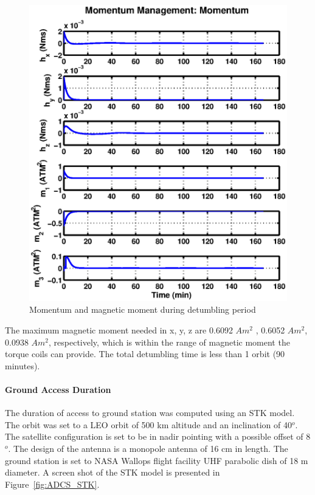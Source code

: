 \documentclass[12pt]{article}
\begin{document}
			\begin{figure}[!ht]
				\centering
				\includegraphics[scale=0.8]{images/ADCS_detumbling.eps}
				\caption{Momentum and magnetic moment during detumbling period}
				\label{fig:ADCS_detumbling}
			\end{figure}

			The maximum magnetic moment needed in x, y, z are 0.6092 $Am^2$ , 0.6052 $Am^2$, 0.0938 $Am^2$, respectively, which is within the range of magnetic moment the torque coils can provide. The total detumbling time is less than 1 orbit (90 minutes). 
			
			\paragraph{Ground Access Duration}
			The duration of access to ground station was computed using an STK model. The orbit was set to a LEO orbit of 500 km altitude and an inclination of 40$^o$. The satellite configuration is set to be in nadir pointing with a possible offset of 8$^o$. The design of the antenna is a monopole antenna of 16 cm in length. The ground station is set to NASA Wallops flight facility UHF parabolic dish of 18 m diameter. A screen shot of the STK model is presented in Figure~\ref{fig:ADCS_STK}. 
			
\end{document}
